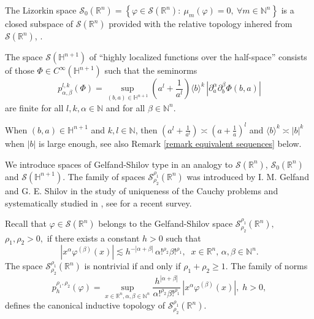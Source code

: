 \documentclass[reqno,12pt]{amsart}
\theoremstyle{plain}
\theoremstyle{definition}
\theoremstyle{remark}
\begin{document}
\par

The Lizorkin space  $\mathcal{S}_0 (\mathbb{R}^{n}) = \left\{\varphi\in
\mathcal{S}(\mathbb{R}^{n}): \: \mu_m (\varphi) = 0,\ \forall m
\in \mathbb{N}^{n} \right\} $ is a closed subspace of
$\mathcal{S}(\mathbb{R}^{n})$ provided with the relative
topology inhered from $\mathcal{S}(\mathbb{R}^{n})$, \cite{hol1, Samko}.

\par

The space $ \mathcal{S} (\mathbb {H}^{n+1}) $ of ``highly localized
functions over the half-space'' \cite{hol1} consists of those $ \Phi
\in C^{\infty} (\mathbb{H}^{n+1}) $ such that the seminorms
\begin{equation} \label{norma-hl}
p^{l,k} _{\alpha, \beta}(\Phi)=\sup_{(b,a)\in
\mathbb {H}^{n+1}}\left(a^{l}+\frac
{1}{a^{l}}\right)
\langle b \rangle ^k \,
\left| \partial^{\alpha} _{a} \partial^{\beta} _{b} \Phi (b,a)\right |
\end{equation}
are finite for all $l,k,\alpha \in \mathbb{N}$ and for all
$ \beta \in\mathbb{N}^{n}$.

\par

When $ (b,a) \in \mathbb {H}^{n+1}$ and $ k,l\in  \mathbb{N}$, then $ \left(a^{l}+\frac
{1}{a^{l}}\right) \asymp \left(a +\frac
{1}{a}\right)^{l} $ and
$ \langle b \rangle ^k \asymp | b | ^k $ when $|b|$ is large enough, see also
Remark \ref{remark equivalent sequences} below.

\par

We introduce spaces of Gelfand-Shilov type in an analogy to
$\mathcal{S} (\mathbb{R}^{n})$,  $\mathcal{S}_0 (\mathbb{R}^{n})$ and
$ \mathcal{S} (\mathbb {H}^{n+1}) $. The family of spaces $ \mathcal{S}_{{\rho_2}}^{{\rho_1}} (\mathbb{R}^n)$
was introduced by I. M. Gelfand and G. E. Shilov
in the study of uniqueness of the Cauchy problems and systematically studied in
\cite{GS}, see \cite{NR} for a recent survey.

\par

Recall that $ \varphi \in
\mathcal{S}(\mathbb{R}^n) $ belongs to the  Gelfand-Shilov space $
\mathcal{S}_{{\rho_2}}^{{\rho_1}} (\mathbb{R}^n),$ $ {\rho_1}, {\rho_2} > 0,$ if  there exists  a constant $  h > 0 $
such that
$$
|x^{\alpha} \varphi^{(\beta)} (x)| \lesssim h^{-|\alpha + \beta|}
\, \alpha!^{{\rho_2}} \beta!^{{\rho_1}}, \; \; x \in \mathbb{R}^n, \,
\alpha, \beta \in \mathbb{N} ^n.
$$
The space $ \mathcal{S}_{{\rho_2}}^{{\rho_1}} (\mathbb{R}^n)$ is nontrivial if and only if $ {\rho_1} + {\rho_2} \geq 1 $. The family of
norms
\begin{equation} \label{norma-GS}
 p_h^{{\rho_1}, {\rho_2}} (\varphi) = \sup_{x \in \mathbb{R}^n, \alpha,
\beta \in \mathbb{N} ^n} \frac{h^{|\alpha + \beta|}}{\alpha!^{{\rho_2}}
\beta!^{{\rho_1}}} \, | x^{\alpha}\varphi^{(\beta)} (x)|, \; h > 0,
\end{equation}
defines the canonical inductive topology of $ \mathcal{S}_{{\rho_2}}^{{\rho_1}} (\mathbb{R}^n). $
\end{document}
